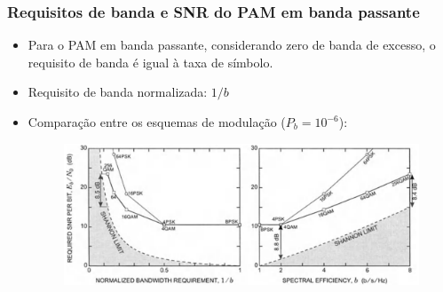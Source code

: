\begin{frame}
	\frametitle{Requisitos de banda e SNR do PAM em banda passante}

	\begin{itemize}
	    \item Para o PAM em banda passante, considerando zero de banda de excesso, o requisito de banda é igual à taxa de símbolo. 
	    \item Requisito de banda normalizada: $1/b$
	    \item Comparação entre os esquemas de modulação ($P_b=10^{-6}$):
	    \begin{figure}[t]	
		\begin{center}
		    \includegraphics[width=0.95\columnwidth]{figs/pam_49}
		\end{center}
	    \end{figure}
	\end{itemize}	
\end{frame}